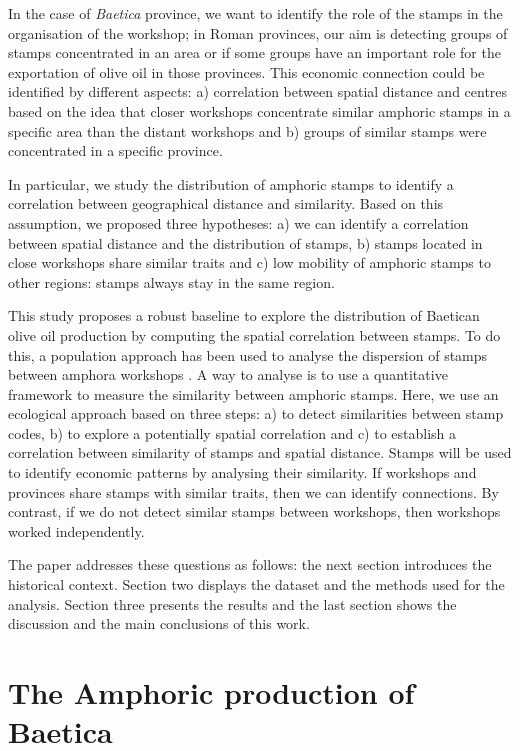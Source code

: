 \documentclass[review]{elsarticle}
\begin{document}
In the case of \textit{Baetica} province, we want to identify the role of the stamps in the organisation of the workshop; in Roman provinces, our aim is detecting groups of stamps concentrated in an area or if some groups have an important role for the exportation of olive oil in those provinces. This economic connection could be identified by different aspects: a) correlation between spatial distance and centres based on the idea that closer workshops concentrate similar amphoric stamps in a specific area than the distant workshops and b) groups of similar stamps were concentrated in a specific province. 

In particular, we study the distribution of amphoric stamps to identify a correlation between geographical distance and similarity. Based on this assumption, we proposed three hypotheses: a) we can identify a correlation between spatial distance and the distribution of stamps, b) stamps located in close workshops share similar traits and c) low mobility of amphoric stamps to other regions: stamps always stay in the same region. 


This study proposes a robust baseline to explore the distribution of Baetican olive oil production by computing the spatial correlation between stamps. To do this, a population approach has been used to analyse the dispersion of stamps between amphora workshops \citep{rubio-campillo_ecology_2018}.  A way to analyse is to use a quantitative framework to measure the similarity between amphoric stamps. Here, we use an ecological approach based on three steps: a) to detect similarities between stamp codes, b) to explore a potentially spatial correlation and c) to establish a correlation between similarity of stamps and spatial distance. Stamps will be used to identify economic patterns by analysing their similarity. If workshops and provinces share stamps with similar traits, then we can identify connections. By contrast, if we do not detect similar stamps between workshops, then workshops worked independently. 

The paper addresses these questions as follows: the next section introduces the historical context. Section two displays the dataset and the methods used for the analysis. Section three presents the results and the last section shows the discussion and the main conclusions of this work. 


\section{The Amphoric production of Baetica}
\end{document}
